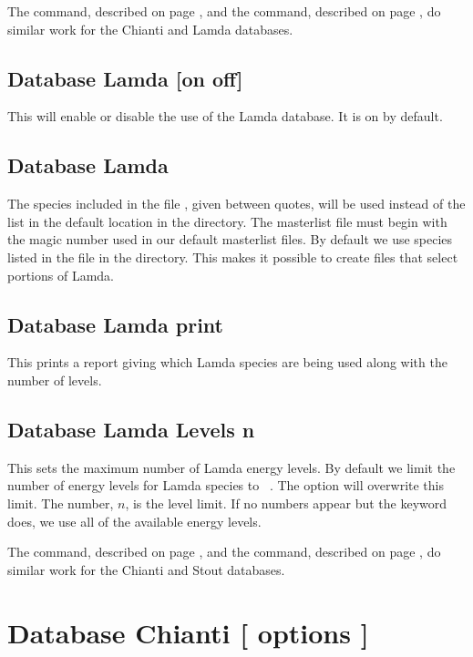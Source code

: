 The  command, described on page \pageref{sec:SetChianti},
and the  command, described on page \pageref{sec:SetStout},
do similar work for the Chianti and Lamda databases.

\subsection{Database Lamda [on off]} 
This will enable or disable the use of the Lamda database.
It is on by default.

\subsection{Database Lamda }
The species included in the file , given between quotes, will be used
instead of the list in the default location in the  directory.
The masterlist file must begin with the magic number used in our default masterlist files.
By default we use species listed in the  file in the 
 directory.
This makes it possible to create  files that select portions of Lamda.

\subsection{Database Lamda print} 
This prints a report giving which Lamda species are being used
along with the number of levels.

\subsection{Database Lamda Levels n} 
This sets the maximum number of Lamda energy levels. 
By default we limit the number of energy levels for Lamda species to 
\nDefaultMolLevels\ .
The  option will overwrite this limit.
The number, $n$, is the level limit.
If no numbers appear but the keyword  does, we use all 
of the available energy levels.

The  command, described on page \pageref{sec:SetChianti},
and the  command, described on page \pageref{sec:SetStout},
do similar work for the Chianti and Stout databases.

\section{Database Chianti [ options ]}
\label{sec:SetChianti}

